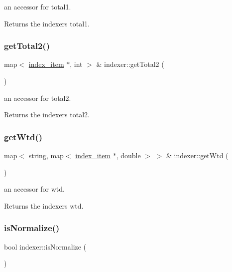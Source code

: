 an accessor for total1. 

\begin{DoxyReturn}{Returns}
the indexer\textquotesingle{}s total1. 
\end{DoxyReturn}
\mbox{\label{classindexer_a8717246599f696d38d2b7051071b8957}} 
\subsubsection{\texorpdfstring{get\+Total2()}{getTotal2()}}
{\footnotesize\ttfamily map$<$ \hyperlink{classindex__item}{index\+\_\+item} $\ast$, int $>$ \& indexer\+::get\+Total2 (\begin{DoxyParamCaption}{ }\end{DoxyParamCaption})}



an accessor for total2. 

\begin{DoxyReturn}{Returns}
the indexer\textquotesingle{}s total2. 
\end{DoxyReturn}
\mbox{\label{classindexer_a8c9a0dadc14a83bdfa36c8b7555cbc6c}} 
\subsubsection{\texorpdfstring{get\+Wtd()}{getWtd()}}
{\footnotesize\ttfamily map$<$ string, map$<$ \hyperlink{classindex__item}{index\+\_\+item} $\ast$, double $>$ $>$ \& indexer\+::get\+Wtd (\begin{DoxyParamCaption}{ }\end{DoxyParamCaption})}



an accessor for wtd. 

\begin{DoxyReturn}{Returns}
the indexer\textquotesingle{}s wtd. 
\end{DoxyReturn}
\mbox{\label{classindexer_a48c05d99699e2191d606936b35ecbb0d}} 
\subsubsection{\texorpdfstring{is\+Normalize()}{isNormalize()}}
{\footnotesize\ttfamily bool indexer\+::is\+Normalize (\begin{DoxyParamCaption}{ }\end{DoxyParamCaption})}




